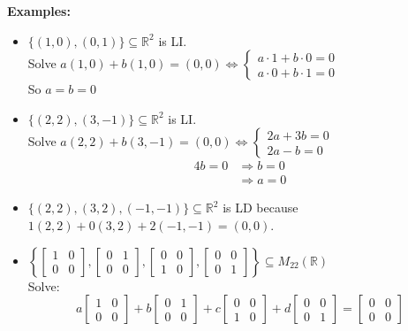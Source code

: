\documentclass[]{article}
\begin{document}
		\normalsize
		{\bf Examples:}
		\begin{itemize}
			\item $\{(1,0),(0,1)\}\subseteq\mathbb{R}^2$ is LI.\\
			Solve $a(1,0)+b(1,0)=(0,0)\iff
			\begin{cases}
				a\cdot 1+b\cdot 0=0\\
				a\cdot 0+b\cdot 1=0
			\end{cases}
			$\\
			So $a=b=0$
			\item $\{(2,2),(3,-1)\}\subseteq\mathbb{R}^2$ is LI.\\
			Solve $a(2,2)+b(3,-1)=(0,0)\iff
			\begin{cases}
				2a+3b=0\\
				2a-b=0
			\end{cases}
			$\\
			\begin{align*}
				4b=0&\Rightarrow b=0\\
				&\Rightarrow a=0
			\end{align*}
			\item $\{(2,2),(3,2),(-1,-1)\}\subseteq\mathbb{R}^2$ is LD because $1(2,2)+0(3,2)+2(-1,-1)=(0,0)$.
			\item $\left\{ \begin{bmatrix} {1}&{0}\\{0}&{0} \end{bmatrix},\begin{bmatrix} {0}&{1}\\{0}&{0} \end{bmatrix},\begin{bmatrix} {0}&{0}\\{1}&{0} \end{bmatrix},\begin{bmatrix} {0}&{0}\\{0}&{1} \end{bmatrix} \right\}\subseteq M_{22}(\mathbb{R})$\\
			Solve:
			$$
				a\begin{bmatrix} {1}&{0}\\{0}&{0} \end{bmatrix}+b\begin{bmatrix} {0}&{1}\\{0}&{0} \end{bmatrix}+c\begin{bmatrix} {0}&{0}\\{1}&{0} \end{bmatrix}+d\begin{bmatrix} {0}&{0}\\{0}&{1} \end{bmatrix}=\begin{bmatrix}{0}&{0}\\{0}&{0}\end{bmatrix}
$$
\end{itemize}
\end{document}

